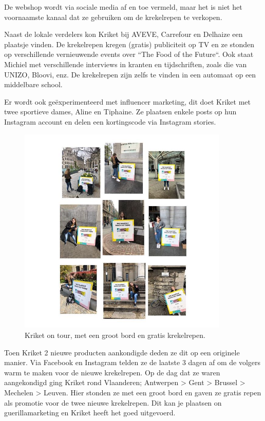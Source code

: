 De webshop wordt via sociale media af en toe vermeld, maar het is niet het voornaamste kanaal dat ze gebruiken om de krekelrepen te verkopen.

Naast de lokale verdelers kon Kriket bij AVEVE, Carrefour en Delhaize een plaatsje vinden. De krekelrepen kregen (gratis) publiciteit op TV en ze stonden op verschillende vernieuwende events over ``The Food of the Future``. Ook staat Michiel met verschillende interviews in kranten en tijdschriften, zoals die van UNIZO, Bloovi, enz. De krekelrepen zijn zelfs te vinden in een automaat op een middelbare school.

Er wordt ook geëxperimenteerd met influencer marketing, dit doet Kriket met twee sportieve dames, Aline en Tiphaine. Ze plaatsen enkele posts op hun Instagram account en delen een kortingscode via Instagram stories.

\begin{figure}[h!]
	\includegraphics[width=100mm]{img/kriket-on-tour.jpg}
	\centering
	\caption{Kriket on tour, met een groot bord en gratis krekelrepen.}
	\label{fig:kriket-on-tour}
\end{figure}

Toen Kriket 2 nieuwe producten aankondigde deden ze dit op een originele manier. Via Facebook en Instagram telden ze de laatste 3 dagen af om de volgers warm te maken voor de nieuwe krekelrepen. Op de dag dat ze waren aangekondigd ging Kriket rond Vlaanderen; Antwerpen > Gent > Brussel > Mechelen > Leuven. Hier stonden ze met een groot bord en gaven ze gratis repen als promotie voor de twee nieuwe krekelrepen. Dit kan je plaatsen on guerillamarketing en Kriket heeft het goed uitgevoerd.


